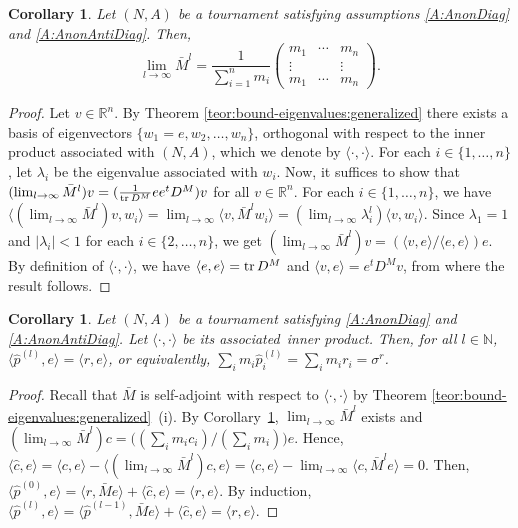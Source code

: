 \documentclass[a4paper,10pt]{article}
\newtheorem{corollary}[theorem]{Corollary}
\theoremstyle{remark}
\newcommand{\TM}{A} %
\newcommand{\MM}{M} %
\newcommand{\DM}{D^\MM} %
\newcommand{\TS}{\sigma^\rv} %
\newcommand{\rv}{r} %
\newcommand{\pv}{p} %
\begin{document}
\begin{corollary}\label{corollary-Amatrix-convergence:generalized}
Let $(N,\TM)$ be a tournament satisfying assumptions
\ref{A:AnonDiag} and \ref{A:AnonAntiDiag}. Then,
\[
\lim_{l\to\infty}\bar {\MM}^l=\frac{1}{\sum_{i=1}^n m_i} \left(
{\begin{array}{ccc}
m_1&\cdots&m_n\\
\vdots&&\vdots\\
m_1&\cdots&m_n
\end{array}}\right).
\]
\end{corollary}

\begin{proof}
Let $v\in\mathbb{R}^n$. By Theorem
\ref{teor:bound-eigenvalues:generalized} there exists a basis of
eigenvectors $\{w_1=e,w_2,\dots,w_n\}$, orthogonal with respect to
the inner product associated with $(N,\TM)$, which we denote by
$\langle\cdot,\cdot\rangle$. For each $i\in\{1,\dots,n\}$, let
$\lambda_i$ be the eigenvalue associated with $w_i$. Now, it
suffices to show that $(\lim_{l\to\infty}\bar
{\MM}^l)v=(\frac{1}{\mathop{\rm tr}\DM}e e^t \DM)v$ for all $v\in
\mathbb R^n$. For each $i\in\{1,\dots,n\}$, we have
$\langle(\lim_{l\to\infty}\bar {\MM}^l)
v,w_i\rangle=\lim_{l\to\infty}\langle v,\bar {\MM}^l
w_i\rangle=(\lim_{l\to\infty}\lambda_i^l)\langle v,w_i\rangle$.
Since $\lambda_1=1$ and $\lvert\lambda_i\rvert<1$ for each
$i\in\{2,\dots,n\}$, we get $(\lim_{l\to\infty}\bar {\MM}^l)
v=(\langle v,e\rangle/\langle e,e\rangle)e$. By definition of
$\langle\cdot,\cdot\rangle$, we have $\langle
e,e\rangle=\mathop{\rm tr}\DM$ and $\langle v,e\rangle =e^t\DM v$,
from where the result follows.
\end{proof}

\begin{corollary}\label{thConservacion}
Let $(N,\TM)$ be a tournament satisfying \ref{A:AnonDiag} and
\ref{A:AnonAntiDiag}. Let $\langle\cdot,\cdot\rangle$ be its
associated~inner product. Then, for all $l\in\mathbb{N}$,
$\langle\hat{\pv}^{(l)},e\rangle=\langle \rv,e\rangle$, or
equivalently, $\sum_{i}m_i \hat{\pv}_i^{(l)}=\sum_{i} m_i
\rv_i=\TS$.
\end{corollary}

\begin{proof}
Recall that $\bar {\MM}$ is self-adjoint with respect to
$\langle\cdot,\cdot\rangle$ by Theorem
\ref{teor:bound-eigenvalues:generalized}~(i). By Corollary~\ref{corollary-Amatrix-convergence:generalized},
$\lim_{l\to\infty}\bar {\MM}^l$ exists and
$(\lim_{l\to\infty}\bar {\MM}^l)c=\bigl((\sum_i m_i c_i)/(\sum_i
m_i)\bigr)e$. Hence, $\langle\hat{c},e\rangle=\langle
c,e\rangle-\langle (\lim_{l\to\infty}\bar {\MM}^l)c, e\rangle=\langle
c,e\rangle-\lim_{l\to\infty}\langle c,\bar {\MM}^l e\rangle=0$. Then,
$\langle\hat{\pv}^{(0)},e\rangle =\langle
\rv,\bar {\MM}e\rangle+\langle\hat{c},e\rangle=\langle \rv,e\rangle$. By
induction, $\langle\hat{\pv}^{(l)},e\rangle =\langle
\hat{\pv}^{(l-1)},\bar {\MM}e\rangle+\langle\hat{c},e\rangle=\langle
\rv,e\rangle$.
\end{proof}
\end{document}
